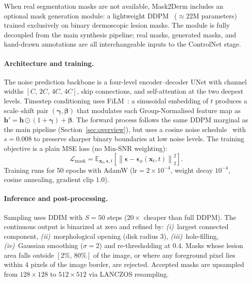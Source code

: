 When real segmentation masks are not available, Mask2Derm includes an optional mask generation module: a lightweight DDPM~\cite{ho2020denoising} ($\approx$22M parameters) trained exclusively on binary dermoscopic lesion masks. The module is fully decoupled from the main synthesis pipeline; real masks, generated masks, and hand-drawn annotations are all interchangeable inputs to the ControlNet stage.

\paragraph{Architecture and training.}
The noise prediction backbone is a four-level encoder–decoder UNet with channel widths $[C,\,2C,\,4C,\,4C]$, skip connections, and self-attention at the two deepest levels. Timestep conditioning uses FiLM~\cite{perez2018film}: a sinusoidal embedding of $t$ produces a scale–shift pair $(\boldsymbol{\gamma},\boldsymbol{\beta})$ that modulates each Group-Normalised feature map as $\mathbf{h}'=\mathbf{h}\odot(1+\boldsymbol{\gamma})+\boldsymbol{\beta}$. The forward process follows the same DDPM marginal as the main pipeline (Section~\ref{sec:overview}), but uses a cosine noise schedule~\cite{nichol2021improved} with $s=0.008$ to preserve sharper binary boundaries at low noise levels. The training objective is a plain MSE loss (no Min-SNR weighting):
\begin{equation}
    \mathcal{L}_\text{mask} = \mathbb{E}_{\mathbf{x}_0,\boldsymbol{\epsilon},t}\!\left[\left\|\boldsymbol{\epsilon} - \boldsymbol{\epsilon}_\phi(\mathbf{x}_t,t)\right\|^2_2\right].
\end{equation}
Training runs for 50 epochs with AdamW ($\mathrm{lr}=2\times10^{-4}$, weight decay $10^{-4}$, cosine annealing, gradient clip $1.0$).

\paragraph{Inference and post-processing.}
Sampling uses DDIM with $S=50$ steps ($20\times$ cheaper than full DDPM). The continuous output is binarized at zero and refined by: \textit{(i)}~largest connected component, \textit{(ii)}~morphological opening (disk radius 3), \textit{(iii)}~hole-filling, \textit{(iv)}~Gaussian smoothing ($\sigma=2$) and re-thresholding at $0.4$. Masks whose lesion area falls outside $[2\%,\,80\%]$ of the image, or where any foreground pixel lies within 4 pixels of the image border, are rejected. Accepted masks are upsampled from $128\times128$ to $512\times512$ via LANCZOS resampling.

